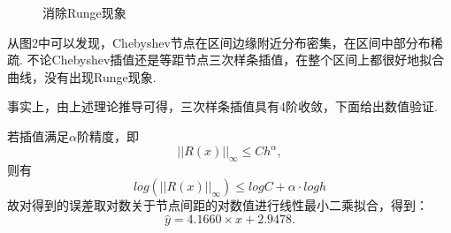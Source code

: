 \documentclass[12pt]{article}
\begin{document}
\begin{figure}[h]
	\label{fig04} 
	\caption{消除Runge现象}
\end{figure}

\par 从图2中可以发现，Chebyshev节点在区间边缘附近分布密集，在区间中部分布稀疏. 不论Chebyshev插值还是等距节点三次样条插值，在整个区间上都很好地拟合曲线，没有出现Runge现象.
\par 事实上，由上述理论推导可得，三次样条插值具有4阶收敛，下面给出数值验证.
\par 若插值满足$\alpha$阶精度，即
$$||R(x)||_{\infty} \leq C h^{\alpha},$$
则有
$$log\left(||R(x)||_{\infty}\right) \leq logC + \alpha\cdot log h$$
故对得到的误差取对数关于节点间距的对数值进行线性最小二乘拟合，得到：
$$\hat{y} = 4.1660 \times x + 2.9478.$$
\end{document}
